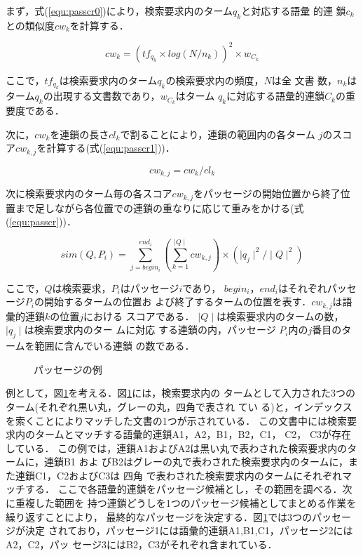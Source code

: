 \begin{enumerate}
まず，式(\ref{equ:passcr0})により，検索要求内のターム$q_{k}$と対応する語彙
的連
鎖$c_{k}$との類似度$cw_{k}$を計算する．

\begin{equation}\label{equ:passcr0}
cw_{k} = (tf_{q_{k}}\times log(N/n_{k}))^2 \times w_{C_{k}}
\end{equation}

ここで，$tf_{q_{k}}$は検索要求内のターム$q_{k}$の検索要求内の頻度，$N$は全
文書
数，$n_{k}$はターム$q_{k}$の出現する文書数であり，$w_{C_{k}}$はターム
$q_{k}$に対応する語彙的連鎖$C_{k}$の重要度である．

次に，$cw_{k}$を連鎖の長さ$cl_{k}$で割ることにより，連鎖の範囲内の各ターム
$j$のスコア$cw_{k,j}$を計算する(式(\ref{equ:passcr1}))．

\begin{equation}\label{equ:passcr1}
cw_{k,j} = cw_{k}/cl_{k}
\end{equation}

\vspace{6mm}
次に検索要求内のターム毎の各スコア$cw_{k,j}$をパッセージの開始位置から終了位
置まで足しながら各位置での連鎖の重なりに応じて重みをかける(式
(\ref{equ:passcr}))．

\begin{equation}\label{equ:passcr}
sim(Q,P_{i}) = \sum_{j=begin_{i}}^{end_{i}} (\sum_{k=1}^{\mid Q\mid}
cw_{k,j})\times (\mid q_{j}\mid^2/\mid Q\mid^2)
\end{equation}

ここで，$Q$は検索要求，$P_{i}$はパッセージ$i$であり，
$begin_{i}$，$end_{i}$はそれぞれパッセージ$P_{i}$の開始するタームの位置お
よび終了するタームの位置を表す．$cw_{k,j}$は語彙的連鎖$k$の位置$j$における
スコアである．
$\mid Q\mid$は検索要求内のタームの数， $\mid q_{j}\mid$は検索要求内のター
ムに対応
する連鎖の内，パッセージ $P_{i}$内の$j$番目のタームを範囲に含んでいる連鎖
の数である．

\end{enumerate}
\begin{figure}[htbp]
\begin{center}
\caption{パッセージの例}
\label{fig:pasimg}
\end{center}
\end{figure}

例として，図\ref{fig:pasimg}を考える．図\ref{fig:pasimg}には，検索要求内の
タームとして入力された3つのターム(それぞれ黒い丸，グレーの丸，四角で表され
てい
る)と，インデックスを索くことによりマッチした文書の1つが示されている．
この文書中には検索要求内のタームとマッチする語彙的連鎖A1，A2，B1，B2，C1，
C2，
C3が存在している．
この例では，連鎖A1およびA2は黒い丸で表わされた検索要求内のタームに，連鎖B1
およ
びB2はグレーの丸で表わされた検索要求内のタームに，また連鎖C1，C2およびC3は
四角
で表わされた検索要求内のタームにそれぞれマッチする．
ここで各語彙的連鎖をパッセージ候補とし，その範囲を調べる．次に重複した範囲を
持つ連鎖どうしを1つのパッセージ候補としてまとめる作業を繰り返すことにより，
最終的なパッセージを決定する．図\ref{fig:pasimg}では3つのパッセージが決定
されており，パッセージ1には語彙的連鎖A1,B1,C1，パッセージ2にはA2，C2，パッ
セージ3にはB2，C3がそれぞれ含まれている．

